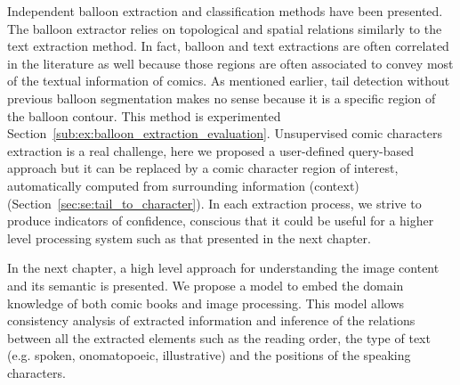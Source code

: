 Independent balloon extraction and classification methods have been presented.
The balloon extractor relies on topological and spatial relations similarly to the text extraction method.
In fact, balloon and text extractions are often correlated in the literature as well because those regions are often associated to convey most of the textual information of comics.
As mentioned earlier, tail detection without previous balloon segmentation makes no sense because it is a specific region of the balloon contour.
This method is experimented Section~\ref{sub:ex:balloon_extraction_evaluation}.
Unsupervised comic characters extraction is a real challenge, here we proposed a user-defined query-based approach but it can be replaced by a comic character region of interest, automatically computed from surrounding information (context) (Section~\ref{sec:se:tail_to_character}).
In each extraction process, we strive to produce indicators of confidence, conscious that it could be useful for a higher level processing system such as that presented in the next chapter.

In the next chapter, a high level approach for understanding the image content and its semantic is presented.
We propose a model to embed the domain knowledge of both comic books and image processing.
This model allows consistency analysis of extracted information and inference of the relations between all the extracted elements such as the reading order, the type of text (e.g. spoken, onomatopoeic, illustrative) and the positions of the speaking characters.



